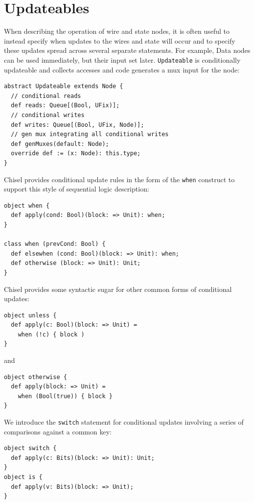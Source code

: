 \documentclass[10pt,twocolumn]{article}
\def\code#1{{\small\tt #1}}
\begin{document}
\section{Updateables}

When describing the operation of wire and state
nodes, it is often useful to instead specify when updates to the
wires and state will occur and to specify these updates spread across
several separate statements.  
For example, Data nodes can be used immediately, but their input set later.
\code{Updateable} is conditionally updateable and 
collects accesses and code generates a mux input for the node:

\begin{lstlisting}
abstract Updateable extends Node {
  // conditional reads
  def reads: Queue[(Bool, UFix)];
  // conditional writes
  def writes: Queue[(Bool, UFix, Node)];
  // gen mux integrating all conditional writes
  def genMuxes(default: Node);
  override def := (x: Node): this.type;
}
\end{lstlisting}

Chisel provides conditional update rules
in the form of the \code{when} construct to support this style of
sequential logic description:
 
\begin{lstlisting}
object when {
  def apply(cond: Bool)(block: => Unit): when;
}

class when (prevCond: Bool) {
  def elsewhen (cond: Bool)(block: => Unit): when;
  def otherwise (block: => Unit): Unit;
}
\end{lstlisting}


Chisel provides some syntactic sugar for other common forms of
conditional updates:

\begin{lstlisting}
object unless {
  def apply(c: Bool)(block: => Unit) = 
    when (!c) { block )
}
\end{lstlisting}

\noindent 
and

\begin{lstlisting}
object otherwise {
  def apply(block: => Unit) = 
    when (Bool(true)) { block }
}
\end{lstlisting}

We introduce the \code{switch} statement for conditional updates
involving a series of comparisons against a common key:

\begin{lstlisting}
object switch {
  def apply(c: Bits)(block: => Unit): Unit;
}
object is {
  def apply(v: Bits)(block: => Unit);
}
\end{lstlisting}
\end{document}
